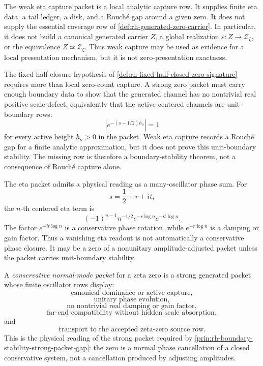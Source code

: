 \begin{principle}
\label{prin:rh-weak-capture-not-zero-presentation-exactness}
The weak eta capture packet is a local analytic capture row. It supplies
finite eta data, a tail ledger, a disk, and a Rouch\'e gap around a
given zero. It does not supply the essential coverage row of
\autoref{def:rh-generated-zero-carrier}. In particular, it does not build
a canonical generated carrier $Z$, a global realization
$\varepsilon:Z\to\mathcal Z_{\zeta}$, or the equivalence
$Z\simeq\mathcal Z_{\zeta}$. Thus weak capture may be used as evidence
for a local presentation mechanism, but it is not
zero-presentation exactness.
\end{principle}

\begin{principle}
\label{prin:rh-boundary-stability-strong-packet-gap}
The fixed-half closure hypothesis of
\autoref{def:rh-fixed-half-closed-zero-signature} requires more than
local zero-count capture. A strong zero packet must carry enough
boundary data to show that the generated channel has no nontrivial real
positive scale defect, equivalently that the active centered channels
are unit-boundary rows:
$$
|e^{-(s-1/2)h_a}|=1
$$
for every active height $h_a>0$ in the packet. Weak eta capture records
a Rouch\'e gap for a finite analytic approximation, but it does not
prove this unit-boundary stability. The missing row is therefore a
boundary-stability theorem, not a consequence of Rouch\'e capture alone.
\end{principle}

\begin{principle}
\label{prin:rh-conservative-oscillator-reading-gap}
The eta packet admits a physical reading as a many-oscillator phase sum.
For
$$
s=\frac12+r+it,
$$
the $n$-th centered eta term is
$$
(-1)^{n-1}n^{-1/2}e^{-r\log n}e^{-it\log n}.
$$
The factor $e^{-it\log n}$ is a conservative phase rotation, while
$e^{-r\log n}$ is a damping or gain factor. Thus a vanishing eta readout
is not automatically a conservative phase closure. It may be a zero of a
nonunitary amplitude-adjusted packet unless the packet carries
unit-boundary stability.
\end{principle}

\begin{definition}
\label{def:rh-conservative-normal-mode-packet}
A \emph{conservative normal-mode packet} for a zeta zero is a strong
generated packet whose finite oscillator rows display:
$$
\text{canonical dominance or active capture},
$$
$$
\text{unitary phase evolution},
$$
$$
\text{no nontrivial real damping or gain factor},
$$
$$
\text{far-end compatibility without hidden scale absorption},
$$
and
$$
\text{transport to the accepted zeta-zero source row}.
$$
This is the physical reading of the strong packet required by
\autoref{prin:rh-boundary-stability-strong-packet-gap}: the zero is a
normal phase cancellation of a closed conservative system, not a
cancellation produced by adjusting amplitudes.
\end{definition}

